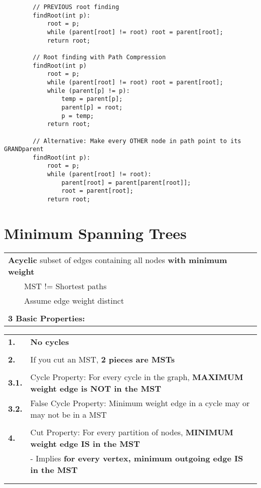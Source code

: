 \documentclass{article}
\newcommand{\tabitem}{~~\llap{\textbullet}~~}
\begin{document}
    \begin{verbatim}
        // PREVIOUS root finding
        findRoot(int p):
            root = p;
            while (parent[root] != root) root = parent[root];
            return root;

        // Root finding with Path Compression
        findRoot(int p)
            root = p;
            while (parent[root] != root) root = parent[root];
            while (parent[p] != p):
                temp = parent[p];
                parent[p] = root;
                p = temp;
            return root;

        // Alternative: Make every OTHER node in path point to its GRANDparent
        findRoot(int p):
            root = p;
            while (parent[root] != root):
                parent[root] = parent[parent[root]];
                root = parent[root];
            return root;
    \end{verbatim}

    \pagebreak

    \section{Minimum Spanning Trees}

    \begin{tabular}{l}
        \textbf{Acyclic} subset of edges containing all nodes \textbf{with minimum weight}\\
        \tabitem MST != Shortest paths\\
        \tabitem Assume edge weight distinct\\\\
        \textbf{3 Basic Properties:}\\
    \end{tabular}

    \noindent\begin{tabular}{ll}
        \textbf{1.} & \textbf{No cycles}\\\\
        \textbf{2.} & If you cut an MST, \textbf{2 pieces are MSTs}\\\\
        \textbf{3.1.} & Cycle Property: For every cycle in the graph, \textbf{MAXIMUM weight edge is NOT in the MST}\\
        \textbf{3.2.} & False Cycle Property: Minimum weight edge in a cycle may or may not be in a MST\\\\
        \textbf{4.} & Cut Property: For every partition of nodes, \textbf{MINIMUM weight edge IS in the MST}\\
        & - Implies \textbf{for every vertex, minimum outgoing edge IS in the MST}\\\\\\
    \end{tabular}   
\end{document}
